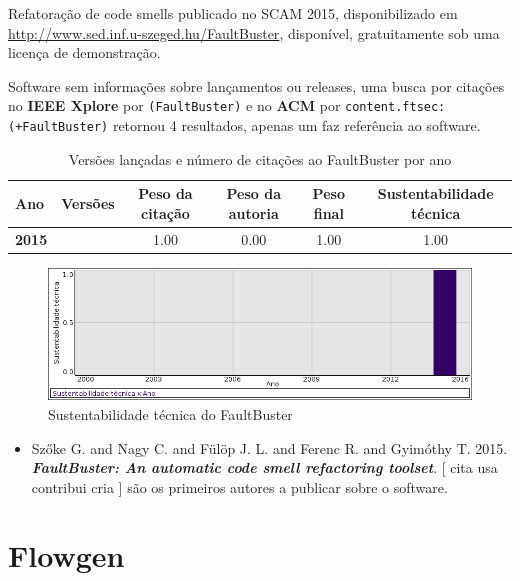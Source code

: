 Refatoração de code smells
publicado no SCAM 2015,
disponibilizado em \url{http://www.sed.inf.u-szeged.hu/FaultBuster},
disponível,
gratuitamente
sob uma licença de demonstração.

Software sem informações sobre lançamentos ou releases,
uma busca por citações no {\bf IEEE Xplore} por
\texttt{(FaultBuster)}
e no {\bf ACM} por
\texttt{content.ftsec:(+FaultBuster)}
retornou
4 resultados,
apenas um faz referência ao software.


\begin{table}[H]
\caption{Versões lançadas e número de citações ao FaultBuster por ano}
\centering
\begin{tabular}{| l | c | c | c | c | c |}
  \hline
  Ano & Versões & Peso da citação & Peso da autoria & Peso final & Sustentabilidade técnica \\
  \hline
            {\bf 2015}
          &
          
          &
          1.00
          &
          0.00
          &
          1.00
          &
            {\color{blue} 1.00}
          \\
\hline
\end{tabular}
\end{table}

\begin{figure}[h]
  \center
  \includegraphics[scale=0.50]{result-documents/charts/faultbuster.png}
  \caption{Sustentabilidade técnica do FaultBuster}
\end{figure}


\begin{itemize}
\item Szőke G. and Nagy C. and Fülöp J. L. and Ferenc R. and Gyimóthy T.
      2015.
        \textbf{\textit{ FaultBuster: An automatic code smell refactoring toolset}}.
      [
          cita
          usa
          contribui
          cria
      ]
são os primeiros autores a publicar sobre o software.
\end{itemize}
\section{Flowgen}

